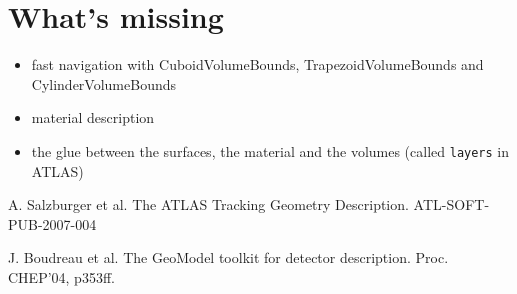 \documentclass[12pt]{article}
\begin{document}
\section{What's missing}
\begin{itemize}
    \item fast navigation with CuboidVolumeBounds, TrapezoidVolumeBounds and CylinderVolumeBounds
    \item material description
    \item the glue between the surfaces, the material and the volumes (called {\tt layers} in ATLAS)
\end{itemize}



\begin{thebibliography}{99}
 A. Salzburger et al. The ATLAS Tracking Geometry Description. ATL-SOFT-PUB-2007-004

 J. Boudreau et al. The GeoModel toolkit for detector description. Proc. CHEP'04, p353ff.

\end{thebibliography}
\end{document}
